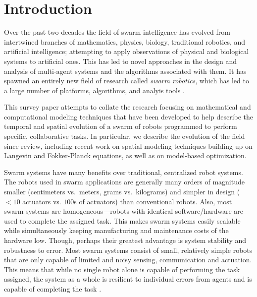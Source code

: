 \documentclass[Main.tex]{subfiles}
\begin{document}
\section{Introduction}
Over the past two decades the field of swarm intelligence has evolved from intertwined branches of mathematics, physics, biology, traditional robotics, and artificial intelligence; attempting to apply observations of physical and biological systems to artificial ones. This has led to novel approaches in the design and analysis of multi-agent systems and the algorithms associated with them. It has spawned an entirely new field of research called \emph{swarm robotics}\citep{Sahin2005}, which has led to a large number of platforms, algorithms, and analyis tools \citep{Brambilla2013}.

This survey paper attempts to collate the research focusing on mathematical and computational modeling techniques that have been developed to help describe the temporal and spatial evolution of a swarm of robots programmed to perform specific, collaborative tasks. In particular, we describe the evolution of the field since  review, including recent work on spatial modeling techniques building up on Langevin and Fokker-Planck equations, as well as on model-based optimization.

Swarm systems have many benefits over traditional, centralized robot systems. The robots used in swarm applications are generally many orders of magnitude smaller (centimeters vs.\ meters, grams vs.\ kilograms) and simpler in design ($<10$ actuators vs. $100$s of actuators) than conventional robots. Also, most swarm systems are homogeneous---robots with identical software/hardware are used to complete the assigned task. This makes swarm systems easily scalable while simultaneously keeping manufacturing and maintenance costs of the hardware low. Though, perhaps their greatest advantage is system stability and robustness to error. Most swarm systems consist of small, relatively simple robots that are only capable of limited and noisy sensing, communication and actuation. This means that while no single robot alone is capable of performing the task assigned, the system as a whole is resilient to individual errors from agents and is capable of completing the task \cite{Winfield2005}.
\end{document}
